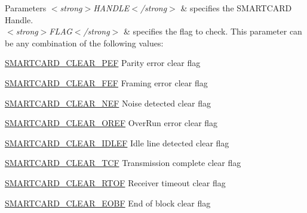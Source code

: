 \begin{DoxyParams}{Parameters}
{\em $<$strong$>$\+H\+A\+N\+D\+L\+E$<$/strong$>$} & specifies the S\+M\+A\+R\+T\+C\+A\+RD Handle. \\
\hline
{\em $<$strong$>$\+F\+L\+A\+G$<$/strong$>$} & specifies the flag to check. This parameter can be any combination of the following values\+: \begin{DoxyItemize}
\item \hyperlink{group___s_m_a_r_t_c_a_r_d___i_t___c_l_e_a_r___flags_gad589617040e5f426122a23364c377da2}{S\+M\+A\+R\+T\+C\+A\+R\+D\+\_\+\+C\+L\+E\+A\+R\+\_\+\+P\+EF} Parity error clear flag \item \hyperlink{group___s_m_a_r_t_c_a_r_d___i_t___c_l_e_a_r___flags_ga3aa5dfa08809a2c1e8cb9f44d3132cc5}{S\+M\+A\+R\+T\+C\+A\+R\+D\+\_\+\+C\+L\+E\+A\+R\+\_\+\+F\+EF} Framing error clear flag \item \hyperlink{group___s_m_a_r_t_c_a_r_d___i_t___c_l_e_a_r___flags_gad462b01ea8cec6eee50e467cec74d864}{S\+M\+A\+R\+T\+C\+A\+R\+D\+\_\+\+C\+L\+E\+A\+R\+\_\+\+N\+EF} Noise detected clear flag \item \hyperlink{group___s_m_a_r_t_c_a_r_d___i_t___c_l_e_a_r___flags_ga8ea1dbe61667748016c1d54bb7192f3f}{S\+M\+A\+R\+T\+C\+A\+R\+D\+\_\+\+C\+L\+E\+A\+R\+\_\+\+O\+R\+EF} Over\+Run error clear flag \item \hyperlink{group___s_m_a_r_t_c_a_r_d___i_t___c_l_e_a_r___flags_ga2f66ef3a43399ba852140a257472f3a1}{S\+M\+A\+R\+T\+C\+A\+R\+D\+\_\+\+C\+L\+E\+A\+R\+\_\+\+I\+D\+L\+EF} Idle line detected clear flag \item \hyperlink{group___s_m_a_r_t_c_a_r_d___i_t___c_l_e_a_r___flags_gad402907f3dc6986bf059ccaa96d27046}{S\+M\+A\+R\+T\+C\+A\+R\+D\+\_\+\+C\+L\+E\+A\+R\+\_\+\+T\+CF} Transmission complete clear flag \item \hyperlink{group___s_m_a_r_t_c_a_r_d___i_t___c_l_e_a_r___flags_ga062da53f5b3be6f682fda0ab5ee6fad3}{S\+M\+A\+R\+T\+C\+A\+R\+D\+\_\+\+C\+L\+E\+A\+R\+\_\+\+R\+T\+OF} Receiver timeout clear flag \item \hyperlink{group___s_m_a_r_t_c_a_r_d___i_t___c_l_e_a_r___flags_ga6ab02ae91a60fc87a1d80a68fb53a765}{S\+M\+A\+R\+T\+C\+A\+R\+D\+\_\+\+C\+L\+E\+A\+R\+\_\+\+E\+O\+BF} End of block clear flag \end{DoxyItemize}
\\
\hline
\end{DoxyParams}

